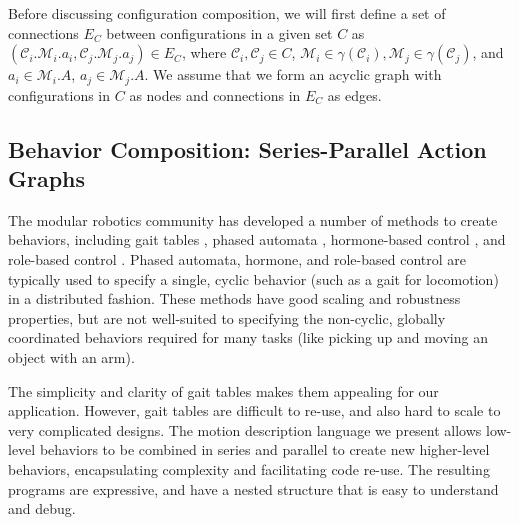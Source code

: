 \documentclass[graybox]{svmult}
\begin{document}
Before discussing configuration composition, we will first define a set of connections $E_C$ between configurations in a given set $C$ as $(\mathcal{C}_i.\mathcal{M}_i.a_i, \mathcal{C}_j.\mathcal{M}_j.a_j) \in E_C$, where $\mathcal{C}_{i},\mathcal{C}_j\in C$, $\mathcal{M}_i \in \gamma(\mathcal{C}_i), \mathcal{M}_j \in \gamma(\mathcal{C}_j)$, and $a_i\in \mathcal{M}_i.A$, $a_j\in \mathcal{M}_j.A$. We assume that we form an
acyclic graph with configurations in $C$ as nodes and connections in $E_C$ as edges.

\subsection{Behavior Composition: Series-Parallel Action Graphs}
\label{sec:behavior-representation}
The modular robotics community has developed a number of methods
to create behaviors, including gait tables \cite{yim1994locomotion}, phased automata
\cite{zhang2003phase}, hormone-based control \cite{salemi2001hormone},
and role-based control \cite{stoy2002using}. Phased automata, hormone, and role-based
control are typically used to specify a single, cyclic behavior (such as a gait for
locomotion) in a distributed fashion.
These methods have good scaling and robustness properties, but are not well-suited
to specifying  the non-cyclic, globally coordinated behaviors required for many tasks
(like picking up and moving an object with an arm).
  
The simplicity and clarity of gait tables makes them appealing for our
application.  However, gait tables are difficult to re-use, and also hard to
scale to very complicated designs. The  motion description language we present
allows low-level behaviors to be combined in series and parallel to create new
higher-level behaviors, encapsulating complexity and facilitating code re-use.
The resulting programs are expressive, and have a nested structure
that is easy to understand and debug.
\end{document}
